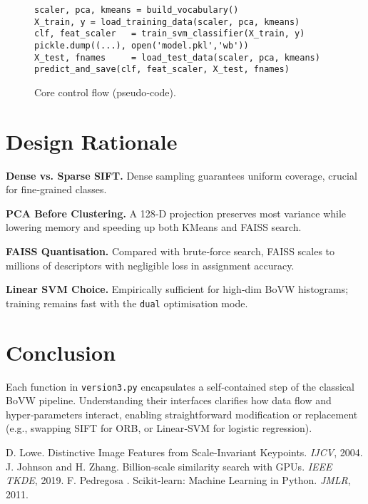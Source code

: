 \documentclass[10pt,twocolumn,letterpaper]{article}
\begin{document}
\begin{figure}[h]
\small
\begin{verbatim}
scaler, pca, kmeans = build_vocabulary()
X_train, y = load_training_data(scaler, pca, kmeans)
clf, feat_scaler   = train_svm_classifier(X_train, y)
pickle.dump((...), open('model.pkl','wb'))
X_test, fnames     = load_test_data(scaler, pca, kmeans)
predict_and_save(clf, feat_scaler, X_test, fnames)
\end{verbatim}
\caption{Core control flow (pseudo‑code).}
\label{lst:mainflow}
\end{figure}

\section{Design Rationale}
\textbf{Dense vs. Sparse SIFT.} Dense sampling guarantees uniform coverage, crucial for fine‑grained classes.

\textbf{PCA Before Clustering.} A 128‑D projection preserves most variance while lowering memory and speeding up both KMeans and FAISS search.

\textbf{FAISS Quantisation.} Compared with brute‑force search, FAISS scales to millions of descriptors with negligible loss in assignment accuracy.

\textbf{Linear SVM Choice.} Empirically sufficient for high‑dim BoVW histograms; training remains fast with the \texttt{dual} optimisation mode.

\section{Conclusion}
Each function in \texttt{version3.py} encapsulates a self‑contained step of the classical BoVW pipeline. Understanding their interfaces clarifies how data flow and hyper‑parameters interact, enabling straightforward modification or replacement (e.g., swapping SIFT for ORB, or Linear‑SVM for logistic regression).

{\small

\begin{thebibliography}{9}\itemsep=-1pt
 D. Lowe. Distinctive Image Features from Scale‑Invariant Keypoints. \textit{IJCV}, 2004.
 J. Johnson and H. Zhang. Billion‑scale similarity search with GPUs. \textit{IEEE TKDE}, 2019.
 F. Pedregosa \etal. Scikit‑learn: Machine Learning in Python. \textit{JMLR}, 2011.
\end{thebibliography}}
\end{document}
